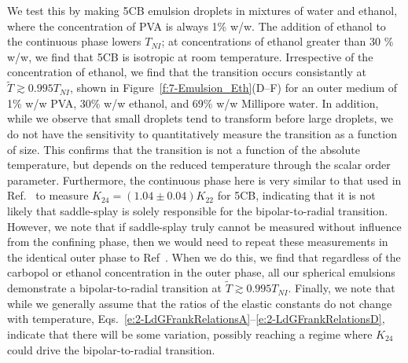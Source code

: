 We test this by making 5CB emulsion droplets in mixtures of water and ethanol, where the concentration of PVA is always 1\% w/w.
The addition of ethanol to the continuous phase lowers $T_{NI}$; at concentrations of ethanol greater than 30 \% w/w, we find that 5CB is isotropic at room temperature.
Irrespective of the concentration of ethanol, we find that the transition occurs consistantly at $\tilde{T} \gtrsim 0.995 T_{NI}$, shown in Figure~\ref{f:7-Emulsion_Eth}(D--F) for an outer medium of 1\% w/w PVA, 30\% w/w ethanol, and 69\% w/w Millipore water.
In addition, while we observe that small droplets tend to transform before large droplets, we do not have the sensitivity to quantitatively measure the transition as a function of size.
This confirms that the transition is not a function of the absolute temperature, but depends on the reduced temperature through the scalar order parameter.
Furthermore, the continuous phase here is very similar to that used in Ref.~\cite{RN24} to measure $K_{24} =(1.04 \pm 0.04)K_{22}$ for 5CB, indicating that it is not likely that saddle-splay is solely responsible for the bipolar-to-radial transition.
However, we note that if saddle-splay truly cannot be measured without influence from the confining phase, then we would need to repeat these measurements in the identical outer phase to Ref~\cite{RN24}.
When we do this, we find that regardless of the carbopol or ethanol concentration in the outer phase, all our spherical emulsions demonstrate a bipolar-to-radial transition at $\tilde{T}\gtrsim 0.995 T_{NI}$.
Finally, we note that while we generally assume that the ratios of the elastic constants do not change with temperature, Eqs.~\ref{e:2-LdGFrankRelationsA}--\ref{e:2-LdGFrankRelationsD}, indicate that there will be some variation, possibly reaching a regime where $K_{24}$ could drive the bipolar-to-radial transition.
